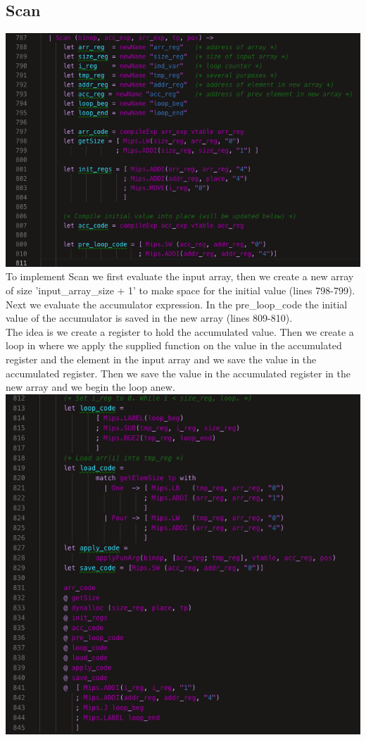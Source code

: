 \subsection{Scan}
\includegraphics[width=\linewidth]{Materials/CodeGen/Scan1}
To implement Scan we first evaluate the input array, then we create a new array of size 'input\_array\_size + 1' to make space for the initial value (lines 798-799). Next we evaluate the accumulator expression. In the pre\_loop\_code the initial value of the accumulator is saved in the new array (lines 809-810).\\
The idea is we create a register to hold the accumulated value. Then we create a loop in where we apply the supplied function on the value in the accumulated register and the element in the input array and we save the value in the accumulated register. Then we save the value in the accumulated register in the new array and we begin the loop anew.
\includegraphics[width=\linewidth]{Materials/CodeGen/Scan2}
